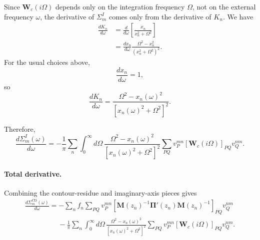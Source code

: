 Since \(\mathbf W_c(i\Omega)\) depends only on the integration frequency
\(\Omega\), not on the external frequency \(\omega\), the derivative of
\(\Sigma_m^I\) comes only from the derivative of \(K_n\).  We have
\begin{align}
    \frac{dK_n}{d\omega}
    &=
    \frac{d}{d\omega}
    \left[
    \frac{x_n}{x_n^2+\Omega^2}
    \right] \\
    &=
    \frac{dx_n}{d\omega}
    \frac{
    \Omega^2-x_n^2
    }
    {
    \left(x_n^2+\Omega^2\right)^2
    }.
\end{align}
For the usual choices above,
\begin{equation}
    \frac{dx_n}{d\omega}=1,
\end{equation}
so
\begin{equation}
    \boxed{
    \frac{dK_n}{d\omega}
    =
    \frac{
    \Omega^2-x_n(\omega)^2
    }
    {
    \left[
    x_n(\omega)^2+\Omega^2
    \right]^2
    }
    }.
\end{equation}

Therefore,
\begin{equation}
    \boxed{
    \frac{d\Sigma_m^I(\omega)}{d\omega}
    =
    -\frac{1}{\pi}
    \sum_n
    \int_0^\infty d\Omega\,
    \frac{
    \Omega^2-x_n(\omega)^2
    }
    {
    \left[
    x_n(\omega)^2+\Omega^2
    \right]^2
    }
    \sum_{PQ}
    v_P^{mn}
    \left[
    \mathbf W_c(i\Omega)
    \right]_{PQ}
    v_Q^{nm}
    }.
\end{equation}

\paragraph{Total derivative.}

Combining the contour-residue and imaginary-axis pieces gives
\begin{align}
    \boxed{
    \frac{d\Sigma_m^{\mathrm{CD}}(\omega)}{d\omega}
    =
    -
    \sum_n f_n
    \sum_{PQ}
    v_P^{mn}
    \left[
    \mathbf M(z_n)^{-1}
    \boldsymbol{\Pi}'(z_n)
    \mathbf M(z_n)^{-1}
    \right]_{PQ}
    v_Q^{nm}
    }
    \nonumber \\
    \boxed{
    \hspace{2cm}
    -
    \frac{1}{\pi}
    \sum_n
    \int_0^\infty d\Omega\,
    \frac{
    \Omega^2-x_n(\omega)^2
    }
    {
    \left[
    x_n(\omega)^2+\Omega^2
    \right]^2
    }
    \sum_{PQ}
    v_P^{mn}
    \left[
    \mathbf W_c(i\Omega)
    \right]_{PQ}
    v_Q^{nm}
    }.
\end{align}

